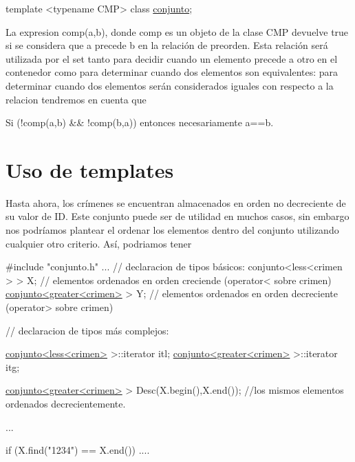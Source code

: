 \begin{DoxyCode}
\textcolor{keyword}{template} <\textcolor{keyword}{typename} CMP> \textcolor{keyword}{class }\hyperlink{classconjunto}{conjunto};
\end{DoxyCode}


La expresion comp(a,b), donde comp es un objeto de la clase C\+M\+P devuelve true si se considera que a precede b en la relación de preorden. Esta relación será utilizada por el set tanto para decidir cuando un elemento precede a otro en el contenedor como para determinar cuando dos elementos son equivalentes\+: para determinar cuando dos elementos serán considerados iguales con respecto a la relacion tendremos en cuenta que \begin{DoxyItemize}
\item Si (!comp(a,b) \&\& !comp(b,a)) entonces necesariamente a==b.\end{DoxyItemize}
\hypertarget{index_platillas}{}\section{Uso de templates}\label{index_platillas}
Hasta ahora, los crímenes se encuentran almacenados en orden no decreciente de su valor de I\+D. Este conjunto puede ser de utilidad en muchos casos, sin embargo nos podríamos plantear el ordenar los elementos dentro del conjunto utilizando cualquier otro criterio. Así, podriamos tener


\begin{DoxyCode}
\textcolor{preprocessor}{#include "conjunto.h"}
...
\textcolor{comment}{// declaracion de tipos básicos:}
conjunto<less<crimen > > X;  \textcolor{comment}{// elementos ordenados en orden creciende  (operator< sobre crimen)}
\hyperlink{classconjunto}{conjunto<greater<crimen>} > Y; \textcolor{comment}{// elementos ordenados en orden decreciente
       (operator> sobre crimen)}

\textcolor{comment}{// declaracion de tipos más complejos:}

\hyperlink{classconjunto}{conjunto<less<crimen>} >::iterator itl;
\hyperlink{classconjunto}{conjunto<greater<crimen>} >::iterator itg;

\hyperlink{classconjunto}{conjunto<greater<crimen>} > Desc(X.begin(),X.end()); \textcolor{comment}{//los mismos elementos
       ordenados decrecientemente.}

... 

\textcolor{keywordflow}{if} (X.find(\textcolor{stringliteral}{"1234"}) == X.end()) 
   ....
\end{DoxyCode}


